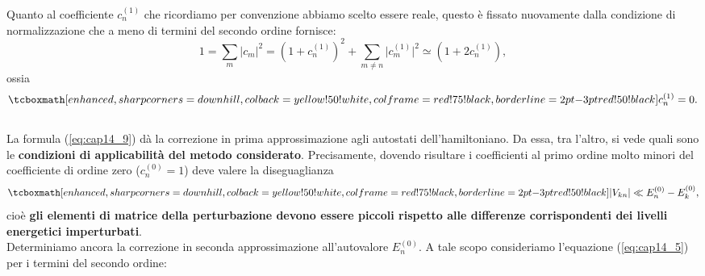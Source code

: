 \documentclass[a4paper,12pt,oneside]{book}
\begin{document}
Quanto al coefficiente $c_n ^{(1)}$ che ricordiamo per convenzione abbiamo scelto essere reale, questo è fissato nuovamente dalla condizione di normalizzazione che a meno di termini del secondo ordine fornisce:
	\begin{equation}
		1= \sum _m \vert c_m \vert ^2 = \left( 1+ c_n ^{(1)}\right) ^2+ \sum _{m\neq n } \vert c_m ^{(1)} \vert ^2 \simeq \left( 1+ 2c_n ^{(1)}\right),
	\end{equation}
ossia
	\begin{equation}
		\tcboxmath[enhanced, sharp corners=downhill, colback=yellow!50!white, colframe=red!75!black, borderline={2pt}{-3pt}{red!50!black}]{
			c_n ^{(1)} =0.
			}
	\label{eq:cap14_10}
	\end{equation}\\
	
La formula (\ref{eq:cap14_9}) dà la correzione in prima approssimazione agli autostati dell'hamiltoniano. Da essa, tra l'altro, si vede quali sono le \textbf{condizioni di applicabilità del metodo considerato}. Precisamente, dovendo risultare i coefficienti al primo ordine molto minori del coefficiente di ordine zero ($c_n ^{(0)} =1$) deve valere la diseguaglianza
	\begin{equation}
		\tcboxmath[enhanced, sharp corners=downhill, colback=yellow!50!white, colframe=red!75!black, borderline={2pt}{-3pt}{red!50!black}]{
			\vert V_{kn} \vert \ll E_ n ^{(0)}-E_ k ^{(0)},
		}
	\end{equation}
cioè \textbf{gli elementi di matrice della perturbazione devono essere piccoli rispetto alle differenze corrispondenti dei livelli energetici imperturbati}.\\

Determiniamo ancora la correzione in seconda approssimazione all'autovalore $E_n ^{(0)}$. A tale scopo consideriamo l'equazione (\ref{eq:cap14_5}) per i termini del secondo ordine:\\
\end{document}
